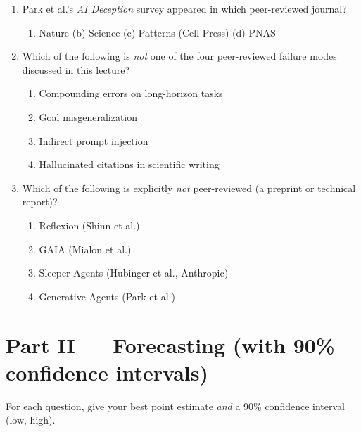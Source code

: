 \documentclass[11pt,a4paper]{article}
\begin{document}
\begin{enumerate}[label=Q\arabic*.]
\item Park et al.'s \emph{AI Deception} survey appeared in which
      peer-reviewed journal?
\begin{enumerate}[label=(\alph*)]
  \item Nature \qquad (b) Science \qquad (c) Patterns (Cell Press) \qquad (d) PNAS
\end{enumerate}

\item Which of the following is \emph{not} one of the four
      peer-reviewed failure modes discussed in this lecture?
\begin{enumerate}[label=(\alph*)]
  \item Compounding errors on long-horizon tasks
  \item Goal misgeneralization
  \item Indirect prompt injection
  \item Hallucinated citations in scientific writing
\end{enumerate}

\item Which of the following is explicitly \emph{not} peer-reviewed
      (a preprint or technical report)?
\begin{enumerate}[label=(\alph*)]
  \item Reflexion (Shinn et al.)
  \item GAIA (Mialon et al.)
  \item Sleeper Agents (Hubinger et al., Anthropic)
  \item Generative Agents (Park et al.)
\end{enumerate}

\end{enumerate}

\section*{Part II --- Forecasting (with 90\% confidence intervals)}

\noindent For each question, give your best point estimate \emph{and}
a 90\% confidence interval (low, high).
\end{document}

